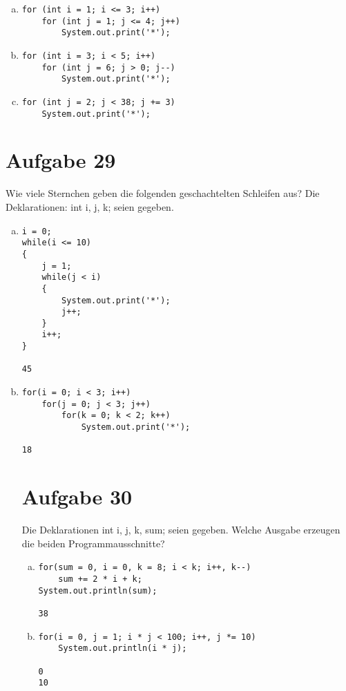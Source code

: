 \documentclass[10pt, oneside]{article}
\begin{document}
\begin{enumerate}[(a)]
\item
\begin{verbatim}
for (int i = 1; i <= 3; i++)
    for (int j = 1; j <= 4; j++)
        System.out.print('*');
\end{verbatim}
\item
\begin{verbatim}
for (int i = 3; i < 5; i++)
    for (int j = 6; j > 0; j--)
        System.out.print('*');
\end{verbatim}
\item
\begin{verbatim}
for (int j = 2; j < 38; j += 3)
    System.out.print('*');
\end{verbatim}
\end{enumerate}

\section{Aufgabe 29}

Wie viele Sternchen geben die folgenden geschachtelten Schleifen aus? Die
Deklarationen: int i, j, k; seien gegeben.

\begin{enumerate}[(a)]
\item
\begin{verbatim}
i = 0;
while(i <= 10)
{
    j = 1;
    while(j < i)
    {
        System.out.print('*');
        j++;
    }
    i++;
}

45
\end{verbatim}

\item
\begin{verbatim}
for(i = 0; i < 3; i++)
    for(j = 0; j < 3; j++)
        for(k = 0; k < 2; k++)
            System.out.print('*');

18
\end{verbatim}

\pagebreak
\section{Aufgabe 30}

Die Deklarationen int i, j, k, sum; seien gegeben. Welche Ausgabe erzeugen
die beiden Programmausschnitte?

\begin{enumerate}[(a)]
\item
\begin{verbatim}
for(sum = 0, i = 0, k = 8; i < k; i++, k--)
    sum += 2 * i + k;
System.out.println(sum);

38
\end{verbatim}

\item
\begin{verbatim}
for(i = 0, j = 1; i * j < 100; i++, j *= 10)
    System.out.println(i * j);

0
10
\end{verbatim}
\end{enumerate}

\end{enumerate}
\end{document}
